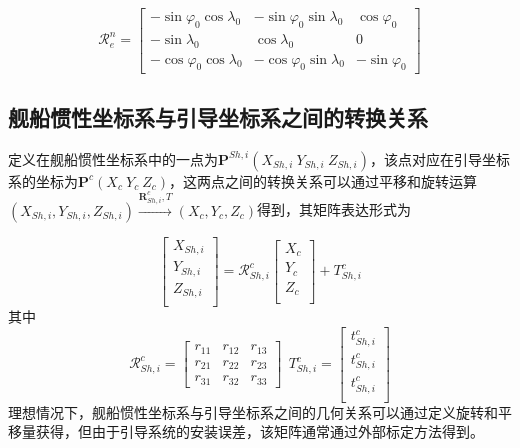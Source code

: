 \begin{equation}
\mathcal{R}_e^n=\left[\begin{array}{ccc}
-\sin \varphi _{0} \cos \lambda _{0} & -\sin \varphi _{0} \sin \lambda _{0} & \cos \varphi _{0}  \\
-\sin \lambda _{0}           &           \cos \lambda _{0}            &          0           \\
-\cos \varphi _{0} \cos \lambda _{0} & -\cos \varphi _{0} \sin \lambda _{0} & -\sin \varphi _{0}
\end{array}\right]
\end{equation}

\subsection{舰船惯性坐标系与引导坐标系之间的转换关系}
定义在舰船惯性坐标系中的一点为$\mathbf{P}^{Sh,i}(X_{Sh,i}\ Y_{Sh,i}\ Z_{Sh,i})$，该点对应在引导坐标系的坐标为$\mathbf{P}^{c}(X_c\ Y_c\ Z_c)$，这两点之间的转换关系可以通过平移和旋转运算$(X_{Sh,i}, Y_{Sh,i}, Z_{Sh,i})\xrightarrow{\textbf{R}_{Sh,i}^c,T}(X_c, Y_c, Z_c) $得到，其矩阵表达形式为

\begin{equation}
\left[\begin{array}{c}
X_{Sh,i}\\
Y_{Sh,i}\\
Z_{Sh,i}\\
\end{array}\right]=\mathcal{R}_{Sh,i}^c
\left[\begin{array}{c}
X_{c}\\
Y_{c}\\
Z_{c}\\
\end{array}\right]+T_{Sh,i}^c
\end{equation}
其中
\begin{equation}
\mathcal{R}_{Sh,i}^c=\left[\begin{array}{ccc}
r_{11} & r_{12} & r_{13} \\
r_{21} & r_{22} & r_{23} \\
r_{31} & r_{32} & r_{33} 
\end{array}\right]
\ \ 
T_{Sh,i}^c=\left[\begin{array}{ccc}
t_{Sh,i}^c\\
t_{Sh,i}^c\\
t_{Sh,i}^c\\
\end{array}\right]
\end{equation}
理想情况下，舰船惯性坐标系与引导坐标系之间的几何关系可以通过定义旋转和平移量获得，但由于引导系统的安装误差，该矩阵通常通过外部标定方法得到。


